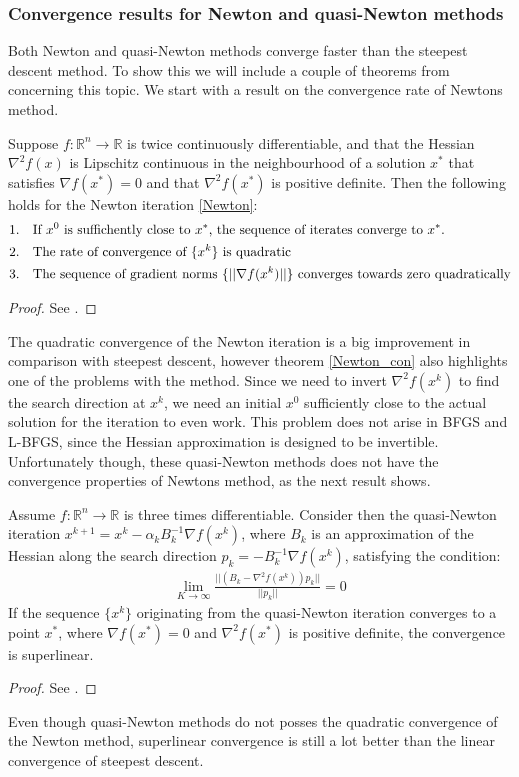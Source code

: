 \subsubsection{Convergence results for Newton and quasi-Newton methods}
Both Newton and quasi-Newton methods converge faster than the steepest descent method. To show this we will include a couple of theorems from \cite{nocedal2006numerical}
concerning this topic. We start with a result on the convergence rate of Newtons method.
\begin{theorem}
\label{Newton_con}
Suppose $f:\mathbb{R}^n\rightarrow\mathbb{R}$ is twice continuously differentiable, and that the Hessian $\nabla^2 f(x)$ is Lipschitz continuous in the neighbourhood of a solution $x^*$ that satisfies $\nabla f(x^*)=0$ and that $\nabla^2 f(x^*)$ is positive definite. Then the following holds for the Newton iteration \ref{Newton}:
\begin{align*}
1.\quad&\textrm{If $x^0$ is suffichently close to $x^*$, the sequence of iterates converge to $x^*$.}\\
2.\quad&\textrm{The rate of convergence of $\{x^k\}$ is quadratic}\\
3.\quad&\textrm{The sequence of gradient norms $ \{||\nabla f(x^k)||\}$ converges towards zero quadratically}
\end{align*}
\end{theorem}
\begin{proof}
See \cite{nocedal2006numerical}.
\end{proof}
\noindent
The quadratic convergence of the Newton iteration is a big improvement in comparison with steepest descent, however theorem \ref{Newton_con} also highlights one of the problems with the method. Since we need to invert $\nabla^2 f(x^k)$ to find the search direction at $x^k$, we need an initial $x^0$ sufficiently close to the actual solution for the iteration to even work. This problem does not arise in BFGS and L-BFGS, since the Hessian approximation is designed to be invertible. Unfortunately though, these quasi-Newton methods does not have the convergence properties of Newtons method, as the next result shows.
\begin{theorem}
Assume $f:\mathbb{R}^n\rightarrow\mathbb{R}$ is three times differentiable. Consider then the quasi-Newton iteration $x^{k+1}=x^k-\alpha_k B_k^{-1}\nabla f(x^k)$, where $B_k$ is an approximation of the Hessian along the search direction $p_k=-B_k^{-1}\nabla f(x^k)$, satisfying the condition:
\begin{align*}
\lim_{K\rightarrow\infty}\frac{||(B_k-\nabla^2f(x^k))p_k||}{||p_k||}=0
\end{align*}
If the sequence $\{x^k\}$ originating from the quasi-Newton iteration converges to a point $x^*$, where $\nabla f(x^*)=0$ and $\nabla^2 f(x^*)$ is positive definite, the convergence is superlinear. 
\end{theorem} 
\begin{proof}
See \cite{nocedal2006numerical}.
\end{proof}
\noindent
Even though quasi-Newton methods do not posses the quadratic convergence of the Newton method, superlinear convergence is still a lot better than the linear convergence of steepest descent.